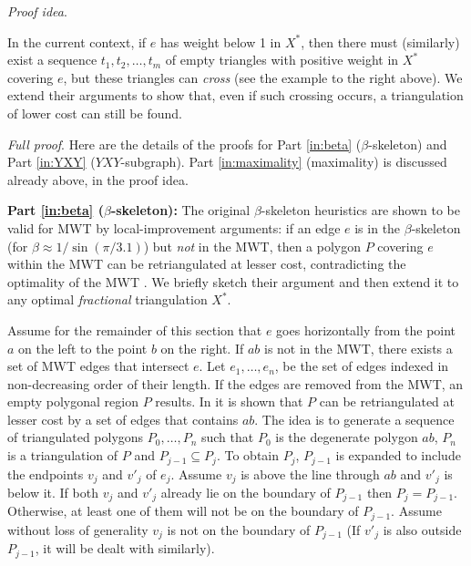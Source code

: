 \documentclass[final]{siamltex}
\newcommand{\edge}{e}
\newcommand{\polygon}{P}
\newcommand{\tri}{t}  \newcommand{\vertex}{v}
\newcommand{\fracTriang}{X}
\newcommand{\YXY}{YXY\xspace}
\newenvironment{proofidea}{\par{\it Proof idea}. \ignorespaces}{}
\newenvironment{fullproof}{\par{\it Full proof}. \ignorespaces}{\endproof}
\begin{document}
\begin{proofidea}
\begin{window}
    \hspace*{\parindent}
    In the current context, if $\edge$ has weight below 1 in $\fracTriang^*$,
    then there must (similarly) exist a sequence $\tri_1,\tri_2,\ldots,\tri_m$ of empty triangles
    with positive weight in $\fracTriang^*$ covering $\edge$, 
    but these triangles can {\em cross} (see the example to the right above).
    We extend their arguments to show that, even if such
    crossing occurs, a triangulation of lower cost can still be found.\end{window}\end{proofidea}




\begin{fullproof}
Here are the details of the proofs for Part \ref{in:beta} ($\beta$-skeleton) and Part \ref{in:YXY} ($\YXY$-subgraph).
Part \ref{in:maximality} (maximality) is discussed already above, in the proof idea.




\medskip
\noindent
{\bf Part \ref{in:beta} ($\beta$-skeleton):}
The original $\beta$-skeleton heuristics 
are shown to be valid for MWT by local-improvement arguments:
if an edge $\edge$ is in the $\beta$-skeleton (for $\beta \approx 1/\sin(\pi/3.1)$) but {\em not} in the MWT,
then a polygon $\polygon$ covering $\edge$ within the MWT can be retriangulated at lesser cost,
contradicting the optimality of the MWT \cite{keil1994computing,cheng1996approaching}.
We briefly sketch their argument and then extend it to any optimal {\em fractional} triangulation $\fracTriang^*$.

Assume for the remainder of this section that $\edge$ goes horizontally from 
the point $a$ on the left to the point $b$ on the right.
If $a b$ is not in the MWT, there exists a set of MWT edges that intersect $\edge$. 
Let $\edge_1,\ldots,\edge_n$, be the set of edges indexed in  
non-decreasing order of their length. 
If the edges are removed from the MWT, an empty polygonal region $\polygon$ results. 
In \cite{keil1994computing,cheng1996approaching}
it is shown that 
$\polygon$ can be retriangulated at lesser cost by a set of edges that contains $a b$. 
The idea is to generate a sequence of triangulated 
polygons $\polygon_0,\ldots,\polygon_n$ such that $\polygon_0$ is the degenerate polygon $a b$, $\polygon_n$ is 
a triangulation of $\polygon$ and $\polygon_{j-1}\subseteq \polygon_j$. To obtain $\polygon_j$, $\polygon_{j-1}$ is expanded 
to include the endpoints $\vertex_j$ and $\vertex'_j$ of $\edge_j$. Assume $\vertex_j$ is above the line through 
$a b$ and $\vertex'_j$ is below it. 
If both $\vertex_j$ and $\vertex'_j$ already lie on the boundary of $\polygon_{j-1}$ then $\polygon_j=\polygon_{j-1}$. 
Otherwise, at least one of them will not be on the boundary of $\polygon_{j-1}$.
Assume without loss of generality $\vertex_j$ is not on the boundary of $\polygon_{j-1}$ 
(If $\vertex'_j$ is also outside $\polygon_{j-1}$, it will be dealt with similarly).


\end{fullproof}
\end{document}

